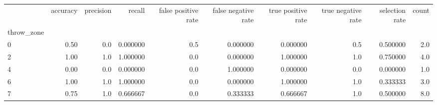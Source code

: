 \begin{tabular}{lrrrrrrrrr}
\toprule
{} &  accuracy &  precision &    recall &  false positive rate &  false negative rate &  true positive rate &  true negative rate &  selection rate &  count \\
throw\_zone &           &            &           &                      &                      &                     &                     &                 &        \\
\midrule
0          &      0.50 &        0.0 &  0.000000 &                  0.5 &             0.000000 &            0.000000 &                 0.5 &        0.500000 &    2.0 \\
2          &      1.00 &        1.0 &  1.000000 &                  0.0 &             0.000000 &            1.000000 &                 1.0 &        0.750000 &    4.0 \\
4          &      0.00 &        0.0 &  0.000000 &                  0.0 &             1.000000 &            0.000000 &                 0.0 &        0.000000 &    1.0 \\
6          &      1.00 &        1.0 &  1.000000 &                  0.0 &             0.000000 &            1.000000 &                 1.0 &        0.333333 &    3.0 \\
7          &      0.75 &        1.0 &  0.666667 &                  0.0 &             0.333333 &            0.666667 &                 1.0 &        0.500000 &    8.0 \\
\bottomrule
\end{tabular}
